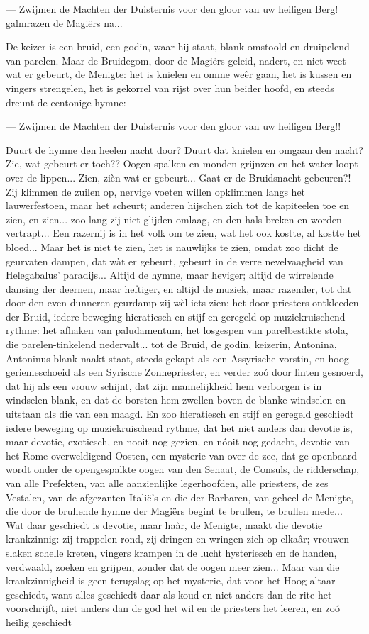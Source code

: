 \documentclass[a4paper, 12pt, oneside, dutch]{article}
\begin{document}
--- Zwijmen de Machten der Duisternis voor den gloor van uw heiligen Berg! galmrazen de Magiërs na...

De keizer is een bruid, een godin, waar hij staat, blank omstoold en druipelend van parelen. Maar de Bruidegom, door de Magiërs geleid, nadert, en niet weet wat er gebeurt, de Menigte: het is knielen en omme weêr gaan, het is kussen en vingers strengelen, het is gekorrel van rijst over hun beider hoofd, en steeds dreunt de eentonige hymne:

--- Zwijmen de Machten der Duisternis voor den gloor van uw heiligen Berg!!

Duurt de hymne den heelen nacht door? Duurt dat knielen en omgaan den nacht? Zie, wat gebeurt er toch?? Oogen spalken en monden grijnzen en het water loopt over de lippen... Zien, zièn wat er gebeurt... Gaat er de Bruidsnacht gebeuren?! Zij klimmen de zuilen op, nervige voeten willen opklimmen langs het lauwerfestoen, maar het scheurt; anderen hijschen zich tot de kapiteelen toe en zien, en zien... zoo lang zij niet glijden omlaag, en den hals breken en worden vertrapt... Een razernij is in het volk om te zien, wat het ook kostte, al kostte het bloed... Maar het is niet te zien, het is nauwlijks te zien, omdat zoo dicht de geurvaten dampen, dat wàt er gebeurt, gebeurt in de verre nevelvaagheid van Helegabalus' paradijs... Altijd de hymne, maar heviger; altijd de wirrelende dansing der deernen, maar heftiger, en altijd de muziek, maar razender, tot dat door den even dunneren geurdamp zij wèl iets zien: het door priesters ontkleeden der Bruid, iedere beweging hieratiesch en stijf en geregeld op muziekruischend rythme: het afhaken van paludamentum, het losgespen van parelbestikte stola, die parelen-tinkelend nedervalt... tot de Bruid, de godin, keizerin, Antonina, Antoninus blank-naakt staat, steeds gekapt als een Assyrische vorstin, en hoog geriemeschoeid als een Syrische Zonnepriester, en verder zoó door linten gesnoerd, dat hij als een vrouw schijnt, dat zijn mannelijkheid hem verborgen is in windselen blank, en dat de borsten hem zwellen boven de blanke windselen en uitstaan als die van een maagd. En zoo hieratiesch en stijf en geregeld geschiedt iedere beweging op muziekruischend rythme, dat het niet anders dan devotie is, maar devotie, exotiesch, en nooit nog gezien, en nóoit nog gedacht, devotie van het Rome overweldigend Oosten, een mysterie van over de zee, dat ge-openbaard wordt onder de opengespalkte oogen van den Senaat, de Consuls, de ridderschap, van alle Prefekten, van alle aanzienlijke legerhoofden, alle priesters, de zes Vestalen, van de afgezanten Italië's en die der Barbaren, van geheel de Menigte, die door de brullende hymne der Magiërs begint te brullen, te brullen mede... Wat daar geschiedt is devotie, maar haàr, de Menigte, maakt die devotie krankzinnig: zij trappelen rond, zij dringen en wringen zich op elkaâr; vrouwen slaken schelle kreten, vingers krampen in de lucht hysteriesch en de handen, verdwaald, zoeken en grijpen, zonder dat de oogen meer zien... Maar van die krankzinnigheid is geen terugslag op het mysterie, dat voor het Hoog-altaar geschiedt, want alles geschiedt daar als koud en niet anders dan de rite het voorschrijft, niet anders dan de god het wil en de priesters het leeren, en zoó heilig geschiedt 
\end{document}

